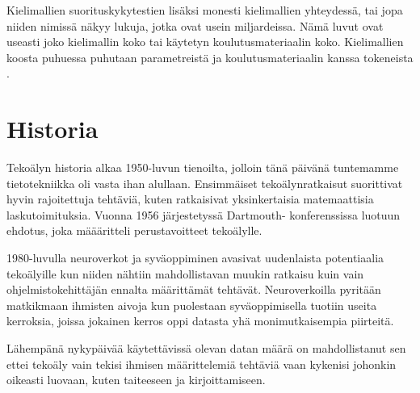 Kielimallien suorituskykytestien lisäksi monesti kielimallien yhteydessä, tai
jopa niiden nimissä näkyy lukuja, jotka ovat usein miljardeissa. Nämä luvut
ovat useasti joko kielimallin koko tai käytetyn koulutusmateriaalin koko.
Kielimallien koosta puhuessa puhutaan parametreistä ja koulutusmateriaalin
kanssa tokeneista \parencite{kaplan2020scalinglawsneurallanguage}.

\section{Historia}

Tekoälyn historia alkaa 1950-luvun tienoilta, jolloin tänä päivänä tuntemamme
tietotekniikka oli vasta ihan alullaan. Ensimmäiset tekoälynratkaisut
suorittivat hyvin rajoitettuja tehtäviä, kuten ratkaisivat yksinkertaisia
matemaattisia laskutoimituksia. Vuonna 1956 järjestetyssä Dartmouth-
konferenssissa luotuun ehdotus, joka määäritteli perustavoitteet tekoälylle.
\parencite{alma9911564814005973}

1980-luvulla neuroverkot ja syväoppiminen avasivat uudenlaista potentiaalia
tekoälyille kun niiden nähtiin mahdollistavan muukin ratkaisu kuin vain
ohjelmistokehittäjän ennalta määrittämät tehtävät. Neuroverkoilla pyritään
matkikmaan ihmisten aivoja kun puolestaan syväoppimisella tuotiin useita
kerroksia, joissa jokainen kerros oppi datasta yhä monimutkaisempia piirteitä.
\parencite{alma9911564814005973}

Lähempänä nykypäivää käytettävissä olevan datan määrä on mahdollistanut sen
ettei tekoäly vain tekisi ihmisen määrittelemiä tehtäviä vaan kykenisi johonkin
oikeasti luovaan, kuten taiteeseen ja kirjoittamiseen.
\parencite{alma9911564814005973}

